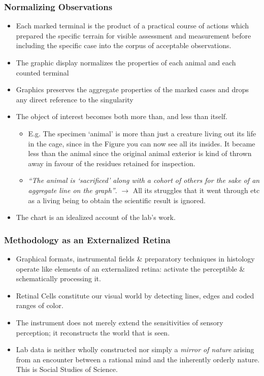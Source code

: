 \documentclass[a4paper]{article}
\begin{document}
\subsubsection{Normalizing Observations}
\begin{itemize}
	\item Each marked terminal is the product of a practical course of actions which prepared the specific terrain for visible assessment and measurement before including the specific case into the corpus of acceptable observations.
	\item The graphic display normalizes the properties of each animal and each counted terminal
	\item Graphics preserves the aggregate properties of the marked cases and drops any direct reference to the singularity
	\newpage
	\item The object of interest becomes both more than, and less than itself.
	\begin{itemize}[label=$\circ$]
		\item E.g. The specimen ‘animal’ is more than just a creature living out its life in the cage, since in the Figure you can now see all its insides. It became less than the animal since the original animal exterior is kind of thrown away in favour of the residues retained for inspection. 
		\item \textit{“The animal is ‘sacrificed’ along with a cohort of others for the sake of an aggregate line on the graph”}. $\to$ All its struggles that it went through etc as a living being to obtain the scientific result is ignored.
	\end{itemize}
	\item The chart is an idealized account of the lab’s work.
\end{itemize}

\subsubsection{Methodology as an Externalized Retina}
\begin{itemize}
	\item Graphical formats, instrumental fields \& preparatory techniques in histology operate like elements of an externalized retina: activate the perceptible \& schematically processing it. 
	\item Retinal Cells constitute our visual world by detecting lines, edges and coded ranges of color.
	\item The instrument does not merely extend the sensitivities of sensory perception; it reconstructs the world that is seen.
	\item Lab data is neither wholly constructed nor simply a \textit{mirror of nature} arising from an encounter between a rational mind and the inherently orderly nature. This is Social Studies of Science.
\end{itemize}
\end{document}
